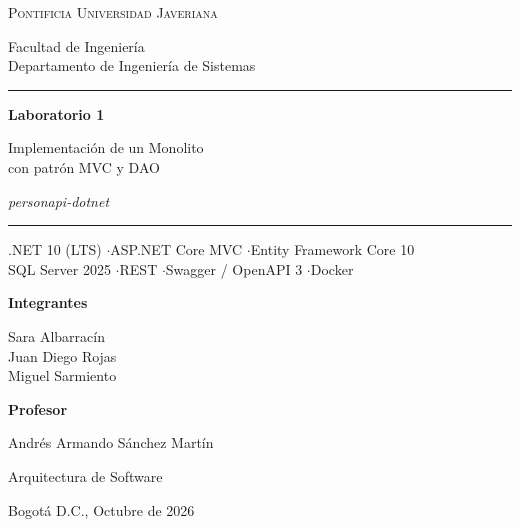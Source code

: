 \documentclass[12pt,letterpaper]{article}
\newcommand{\universidad}{Pontificia Universidad Javeriana}
\newcommand{\facultad}{Facultad de Ingeniería}
\newcommand{\departamento}{Departamento de Ingeniería de Sistemas}
\newcommand{\asignatura}{Arquitectura de Software}
\newcommand{\profesor}{Andrés Armando Sánchez Martín}
\newcommand{\integranteA}{Sara Albarracín}
\newcommand{\integranteB}{Juan Diego Rojas}
\newcommand{\integranteC}{Miguel Sarmiento}
\newcommand{\ciudad}{Bogotá D.C.}
\newcommand{\fecha}{Octubre de 2026}
\begin{document}

\begin{titlepage}
  \thispagestyle{empty}
  \centering
  {\large\scshape \universidad\par}
  \vspace{0.2cm}
  {\normalsize \facultad\\ \departamento\par}
  \vspace{0.6cm}
  \vspace{2.2cm}
  {\color{azulj}\rule{\linewidth}{1.2pt}\par}
  \vspace{0.4cm}
  {\Huge\bfseries Laboratorio 1\par}
  \vspace{0.3cm}
  {\LARGE Implementación de un Monolito\\ con patrón MVC y DAO\par}
  \vspace{0.3cm}
  {\large\itshape personapi-dotnet\par}
  \vspace{0.2cm}
  {\color{azulj}\rule{\linewidth}{1.2pt}\par}
  \vspace{1.2cm}
  {\normalsize .NET 10 (LTS) \quad$\cdot$\quad ASP.NET Core MVC \quad$\cdot$\quad Entity Framework Core 10\\
   SQL Server 2025 \quad$\cdot$\quad REST \quad$\cdot$\quad Swagger / OpenAPI 3 \quad$\cdot$\quad Docker\par}
  \vfill
  {\large\bfseries Integrantes\par}
  \vspace{0.2cm}
  {\large \integranteA\\ \integranteB\\ \integranteC\par}
  \vspace{1cm}
  {\large\bfseries Profesor\par}
  \vspace{0.2cm}
  {\large \profesor\par}
  \vspace{1cm}
  {\large \asignatura\par}
  {\large \ciudad, \fecha\par}
\end{titlepage}
\end{document}
